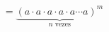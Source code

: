 \documentclass[preview]{standalone}
\begin{document}
\begin{align*}
=\underbrace{(a \cdot a \cdot a \cdot a \cdot a \cdots a)^m}_{n \text{ vezes}}
\end{align*}
\end{document}
